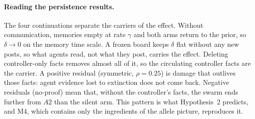 \documentclass[10pt,a4paper]{article}
\begin{document}
\begin{table}[h]
\centering\small
{}
\caption{M4 after the controller stops; simulation in brackets. Half-time: time for $\delta$ to fall to half its value
at $t=30$. Removal residual: $\delta(130)$ after controller-only facts are deleted.}
\label{tab:poststop}
\end{table}

\paragraph{Reading the persistence results.} The four continuations separate the carriers of the effect. Without
communication, memories empty at rate $\gamma$ and both arms return to the prior, so $\delta\to0$ on the memory time
scale. A frozen board keeps $\delta$ flat without any new posts, so what agents read, not what they post, carries the
effect. Deleting controller-only facts removes almost all of it, so the circulating controller facts are the carrier. A
positive residual (symmetric, $\rho=0.25$) is damage that outlives those facts: agent evidence lost to extinction does not
come back. Negative residuals (no-proof) mean that, without the controller's facts, the swarm ends further from $A2$ than
the silent arm. This pattern is what Hypothesis~2 predicts, and M4, which contains only the ingredients of the allele
picture, reproduces it.
\end{document}
